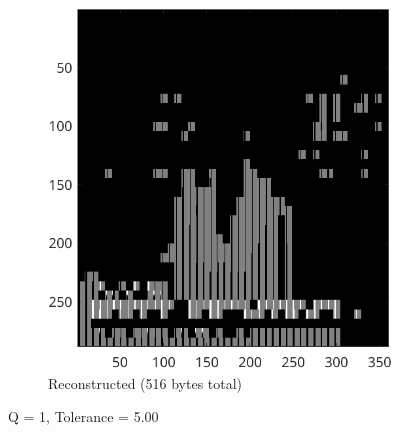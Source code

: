 \documentclass{article}
\begin{document}
\begin{figure}[ht]
\begin{subfigure}[t]{0.45\textwidth}
			\includegraphics[width=\textwidth]{2B_Input1Reconstructed}

			\caption{Reconstructed (516 bytes total)}
			\label{fig:2B_Input1Reconstructed}

		\end{subfigure}

		\caption{Q = 1, Tolerance = 5.00}
		\label{fig:2B_Input1}
	\end{figure}
\end{document}
